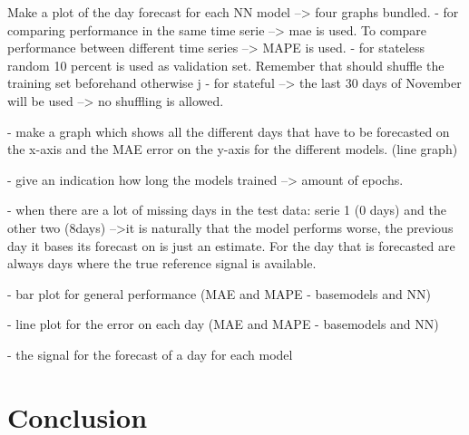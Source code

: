 Make a plot of the day forecast for each NN model --> four graphs bundled. 
- for comparing performance in the same time serie --> mae is used. To compare performance between different time series --> MAPE is used. 
- for stateless random 10 percent is used as validation set. Remember that should shuffle the training set beforehand otherwise j
- for stateful --> the last 30 days of November will be used --> no shuffling is allowed.

- make a graph which shows all the different days that have to be forecasted on the x-axis and the MAE error on the y-axis for the different models. (line graph)

- give an indication how long the models trained --> amount of epochs. 

- when there are a lot of missing days in the test data: serie 1 (0 days) and the other two (8days) -->it is naturally that the model performs worse, the previous day it bases its forecast on is just an estimate. For the day that is forecasted are always days where the true reference signal is available. 



- bar plot for general performance (MAE and MAPE - basemodels and NN)

- line plot for the error on each day (MAE and MAPE - basemodels and NN)

- the signal for the forecast of a day for each model


\section{Conclusion}
\lipsum[86-88]

